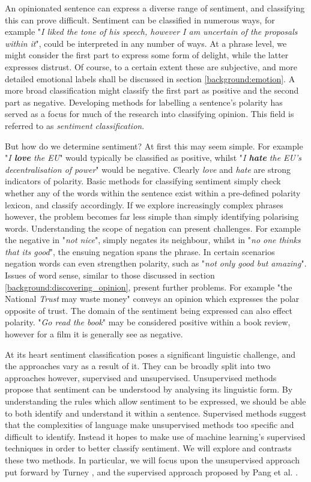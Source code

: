 An opinionated sentence can express a diverse range of sentiment, and classifying this can prove difficult. Sentiment can be classified in numerous ways, for example "\emph{I liked the tone of his speech, however I am uncertain of the proposals within it}", could be interpreted in any number of ways. At a phrase level, we might consider the first part to express some form of delight, while the latter expresses distrust. Of course, to a certain extent these are subjective, and more detailed emotional labels shall be discussed in section \ref{background:emotion}. A more broad classification might classify the first part as positive and the second part as negative. Developing methods for labelling a sentence's polarity has served as a focus for much of the research into classifying opinion. This field is referred to as \emph{sentiment classification}.

But how do we determine sentiment? At first this may seem simple. For example "\emph{I \textbf{love} the EU}" would typically be classified as positive, whilst "\emph{I \textbf{hate} the EU's decentralisation of power}" would be negative. Clearly \emph{love} and \emph{hate} are strong indicators of polarity. Basic methods for classifying sentiment simply check whether any of the words within the sentence exist within a pre-defined polarity lexicon, and classify accordingly. If we explore increasingly complex phrases however, the problem becomes far less simple than simply identifying polarising words. Understanding the scope of negation can present challenges. For example the negative in "\emph{not nice}", simply negates its neighbour, whilst in "\emph{no one thinks that its good}", the ensuing negation spans the phrase. In certain scenarios negation words can even strengthen polarity, such as "\emph{not only good but amazing}". Issues of word sense, similar to those discussed in section \ref{background:discovering_opinion}, present further problems. For example "the National \emph{Trust} may waste money" conveys an opinion which expresses the polar opposite of trust. The domain of the sentiment being expressed can also effect polarity. "\emph{Go read the book}" may be considered positive within a book review, however for a film it is generally see as negative.

At its heart sentiment classification poses a significant linguistic challenge, and the approaches vary as a result of it. They can be broadly split into two approaches however, supervised and unsupervised. Unsupervised methods propose that sentiment can be understood by analysing its linguistic form. By understanding the rules which allow sentiment to be expressed, we should be able to both identify and understand it within a sentence. Supervised methods suggest that the complexities of language make unsupervised methods too specific and difficult to identify. Instead it hopes to make use of machine learning's supervised techniques in order to better classify sentiment. We will explore and contrasts these two methods. In particular, we will focus upon the unsupervised approach put forward by Turney \cite{Turney:2002vv}, and the supervised approach proposed by Pang et al. \cite{Pang:2002tu}.

